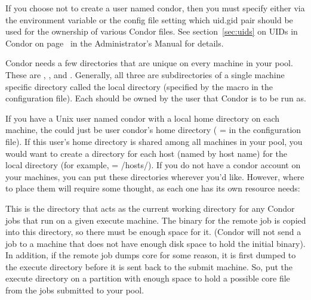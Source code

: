 \begin{description}
If you choose not to create a user named condor,
then you must specify either via the
 environment variable or the 
config file setting which uid.gid pair should be used for
the ownership of various Condor files.  
See section~\ref{sec:uids} on UIDs in Condor on
page~\pageref{sec:uids} in the Administrator's Manual for details.

\item[6. Where should the machine-specific directories for
Condor go?]

Condor needs a few directories that are unique on every machine in
your pool.  These are 
, 
, and 
.  Generally, all
three are subdirectories of a single machine specific directory called
the local directory (specified by the  macro
in the configuration file).
Each should be owned by the user that Condor is to be run as.

If you have a Unix user named condor with a local home directory on each
machine, the  could just be user condor's home
directory ( =  in the 
configuration file).
If this user's home directory is shared among all machines in your
pool, you would want to create a directory for each host (named by
host name) for the local directory (for example,  =
/hosts/).  If you do not
have a condor account on your machines, you can put these directories
wherever you'd like.
However, where to place them will require some
thought, as each one has its own resource needs:

\begin{description}
\item[\File{execute}] This is the directory that acts as the current working
directory for any Condor jobs that run on a given execute machine.
The binary for the remote job is copied into this directory, so
there
must be enough space for it.  (Condor will not send a job to a
machine that does not have enough disk space to hold the initial
binary).  In addition, if the remote job dumps core for some reason,
it is first dumped to the execute directory before it is sent back to
the submit machine.  So, put the execute directory on
a partition with enough space to hold a possible core file from the
jobs submitted to your pool.


\end{description}
\end{description}
